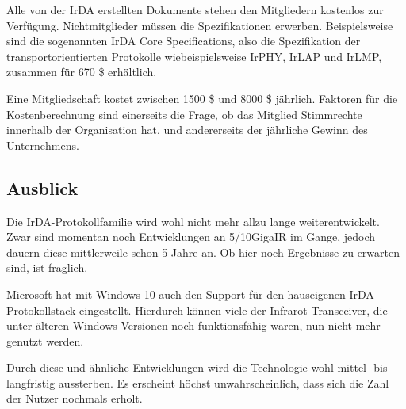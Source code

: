 \begin{multicols}{3}
Alle von der IrDA erstellten Dokumente stehen den Mitgliedern kostenlos zur Verfügung. Nichtmitglieder müssen die Spezifikationen erwerben. Beispielsweise sind die sogenannten IrDA Core Specifications, also die Spezifikation der transportorientierten Protokolle wiebeispielsweise IrPHY, IrLAP und IrLMP, zusammen für 670 \$ erhältlich.

Eine Mitgliedschaft kostet zwischen 1500 \$ und 8000 \$ jährlich. Faktoren für die Kostenberechnung sind einerseits die Frage, ob das Mitglied Stimmrechte innerhalb der Organisation hat, und andererseits der jährliche Gewinn des Unternehmens.

\subsection*{Ausblick}
Die IrDA-Protokollfamilie wird wohl nicht mehr allzu lange weiterentwickelt. Zwar sind momentan noch Entwicklungen an 5/10GigaIR im Gange, jedoch dauern diese mittlerweile schon 5 Jahre an. Ob hier noch Ergebnisse zu erwarten sind, ist fraglich.

Microsoft hat mit Windows 10 auch den Support für den hauseigenen IrDA-Protokollstack eingestellt. Hierdurch können viele der Infrarot-Transceiver, die unter älteren Windows-Versionen noch funktionsfähig waren, nun nicht mehr genutzt werden. 

Durch diese und ähnliche Entwicklungen wird die Technologie wohl mittel- bis langfristig aussterben. Es erscheint höchst unwahrscheinlich, dass sich die Zahl der Nutzer nochmals erholt.

\printbibliography[segment=8,heading=subbibliography]
\end{multicols}

\newpage
